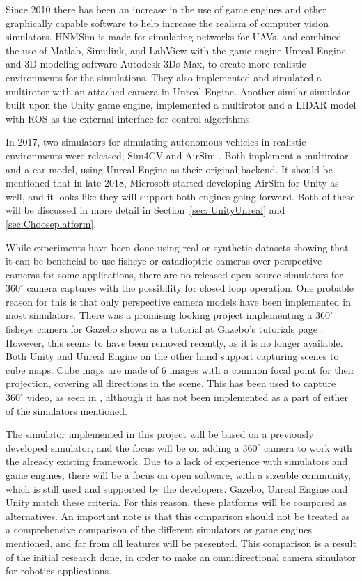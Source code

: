 Since 2010 there has been an increase in the use of game engines and other graphically capable software to help increase the realism of computer vision simulators. HNMSim \cite{HNMSimPaper} is made for simulating networks for UAVs, and combined the use of Matlab, Simulink, and LabView with the game engine Unreal Engine and 3D modeling software Autodesk 3Ds Max, to create more realistic environments for the simulations. They also implemented and simulated a multirotor with an attached camera in Unreal Engine. Another similar simulator\cite{UnityROSsim} built upon the Unity game engine, implemented a multirotor and a LIDAR model with ROS as the external interface for control algorithms.

In 2017, two simulators for simulating autonomous vehicles in realistic environments were released; Sim4CV \cite{Sim4CV_paper} and AirSim \cite{Airsim_paper}. Both implement a multirotor and a car model, using Unreal Engine as their original backend. It should be mentioned that in late 2018, Microsoft started developing AirSim for Unity as well, and it looks like they will support both engines going forward. Both of these will be discussed in more detail in Section~\ref{sec: UnityUnreal} and \ref{sec:Chooseplatform}.

While experiments have been done using real or synthetic datasets showing that it can be beneficial to use fisheye or catadioptric cameras over perspective cameras \cite{Zhang2016BenefitOL, OmniVIOKalman, CompOmniVSLAM} for some applications, there are no released open source simulators for $360^\circ$ camera captures with the possibility for closed loop operation. One probable reason for this is that only perspective camera models have been implemented in most simulators. There was a promising looking project implementing a $360^\circ$ fisheye camera for Gazebo shown as a tutorial at Gazebo's tutorials page \cite{GazeboWideWeb}. However, this seems to have been removed recently, as it is no longer available. Both Unity and Unreal Engine on the other hand support capturing scenes to cube maps. Cube maps are made of 6 images with a common focal point for their projection, covering all directions in the scene. This has been used to capture $360^\circ$ video, as seen in \cite{UnityCubeCapture, UnrealCubeCapture}, although it has not been implemented as a part of either of the simulators mentioned. 

The simulator implemented in this project will be based on a previously developed simulator, and the focus will be on adding a $360^\circ$ camera to work with the already existing framework. Due to a lack of experience with simulators and game engines, there will be a focus on open software, with a sizeable community, which is still used and supported by the developers. Gazebo, Unreal Engine and Unity match these criteria. For this reason, these platforms will be compared as alternatives. An important note is that this comparison should not be treated as a comprehensive comparison of the different simulators or game engines mentioned, and far from all features will be presented. This comparison is a result of the initial research done, in order to make an omnidirectional camera simulator for robotics applications.

